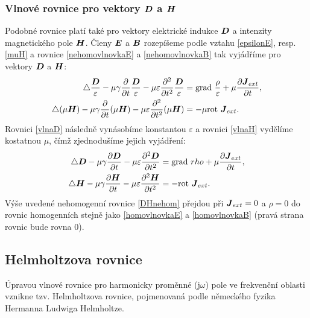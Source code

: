 \documentclass[12pt,a4paper,oneside]{article}
\numberwithin{equation}{section} %
\numberwithin{figure}{section} %
\numberwithin{table}{section} %
\newcommand{\mj}{\mathrm{j}} %
\renewcommand{\vec}[1]{\mbox{\boldmath$#1$}} %
\newcommand{\grad}{\mathrm{grad}\ }
\newcommand{\rot}{\mathrm{rot}\ }
\begin{document}
\subsubsection*{Vlnové rovnice pro vektory $\vec{D}$ a $\vec{H}$}
Podobné rovnice platí také pro vektory elektrické indukce $\vec{D}$ a intenzity magnetického pole $\vec{H}$. Členy $\vec{E}$ a $\vec{B}$ rozepíšeme podle vztahu \ref{epsilonE}, resp. \ref{muH} a rovnice \ref{nehomovlnovkaE} a \ref{nehomovlnovkaB} tak vyjádříme pro vektory $\vec{D}$ a $\vec{H}$:
\begin{subequations}
\begin{align}
\label{vlnaD}
\triangle \frac{\vec{D}}{\varepsilon} - \mu \gamma \frac{\partial}{\partial t} \frac{\vec{D}}{\varepsilon} - \mu \varepsilon \frac{\partial ^2}{\partial t ^2} \frac{\vec{D}}{\varepsilon} &= \grad \frac{\rho}{\varepsilon} + \mu \frac{\partial \vec{J} _{ext}}{\partial t} ,
\\
\label{vlnaH}
\triangle (\mu \vec{H}) - \mu \gamma \frac{\partial}{\partial t} (\mu \vec{H}) - \mu \varepsilon \frac{\partial ^2}{\partial t ^2} (\mu \vec{H}) &= - \mu \rot \vec{J} _{ext}.
\end{align}
\end{subequations}
Rovnici \ref{vlnaD} následně vynásobíme konstantou $\varepsilon$ a rovnici \ref{vlnaH} vydělíme kostatnou $\mu$, čímž zjednodušíme jejich vyjádření:
\begin{subequations}
\label{DHnehom}
\begin{align}
\label{nehomovlnovkaD}
\triangle \vec{D} - \mu \gamma \frac{\partial \vec{D}}{\partial t} - \mu \varepsilon \frac{\partial ^2 \vec{D}}{\partial t ^2} &= \grad rho + \mu \frac{\partial \vec{J} _{ext}}{\partial t} ,
\\
\label{nehomovlnovkaH}
\triangle \vec{H} - \mu \gamma \frac{\partial \vec{H}}{\partial t} - \mu \varepsilon \frac{\partial ^2 \vec{H}}{\partial t ^2} &= - \rot \vec{J} _{ext}.
\end{align}
\end{subequations}
Výše uvedené nehomogenní rovnice \ref{DHnehom} přejdou při $\vec{J} _{ext} = 0$ a $\rho = 0$ do rovnic homogenních stejně jako \ref{homovlnovkaE} a \ref{homovlnovkaB} (pravá strana rovnic bude rovna 0). \cite{Mayer}



\subsection{Helmholtzova rovnice}
Úpravou vlnové rovnice pro harmonicky proměnné ($\mj \omega$) pole ve frekvenční oblasti vznikne tzv. Helmholtzova rovnice, pojmenovaná podle německého fyzika Hermanna Ludwiga Helmholtze.
\end{document}
